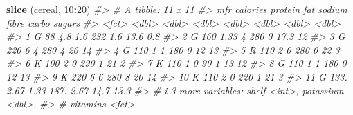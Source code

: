 \documentclass[
]{book}
\newenvironment{Shaded}{\begin{snugshade}}{\end{snugshade}}
\newcommand{\CommentTok}[1]{\textcolor[rgb]{0.56,0.35,0.01}{\textit{#1}}}
\newcommand{\DecValTok}[1]{\textcolor[rgb]{0.00,0.00,0.81}{#1}}
\newcommand{\FunctionTok}[1]{\textcolor[rgb]{0.13,0.29,0.53}{\textbf{#1}}}
\newcommand{\NormalTok}[1]{#1}
\newcommand{\SpecialCharTok}[1]{\textcolor[rgb]{0.81,0.36,0.00}{\textbf{#1}}}
\begin{document}
\begin{Shaded}
\begin{Highlighting}[]
\FunctionTok{slice}\NormalTok{ (cereal, }\DecValTok{10}\SpecialCharTok{:}\DecValTok{20}\NormalTok{)}
\CommentTok{\#\textgreater{} \# A tibble: 11 x 11}
\CommentTok{\#\textgreater{}    mfr   calories protein   fat sodium fibre carbo sugars}
\CommentTok{\#\textgreater{}    \textless{}fct\textgreater{}    \textless{}dbl\textgreater{}   \textless{}dbl\textgreater{} \textless{}dbl\textgreater{}  \textless{}dbl\textgreater{} \textless{}dbl\textgreater{} \textless{}dbl\textgreater{}  \textless{}dbl\textgreater{}}
\CommentTok{\#\textgreater{}  1 G          88     4.8   1.6    232   1.6   13.6    0.8}
\CommentTok{\#\textgreater{}  2 G         160     1.33  4      280   0     17.3   12  }
\CommentTok{\#\textgreater{}  3 G         220     6     4      280   4     26     14  }
\CommentTok{\#\textgreater{}  4 G         110     1     1      180   0     12     13  }
\CommentTok{\#\textgreater{}  5 R         110     2     0      280   0     22      3  }
\CommentTok{\#\textgreater{}  6 K         100     2     0      290   1     21      2  }
\CommentTok{\#\textgreater{}  7 K         110     1     0       90   1     13     12  }
\CommentTok{\#\textgreater{}  8 G         110     1     1      180   0     12     13  }
\CommentTok{\#\textgreater{}  9 K         220     6     6      280   8     20     14  }
\CommentTok{\#\textgreater{} 10 K         110     2     0      220   1     21      3  }
\CommentTok{\#\textgreater{} 11 G         133.    2.67  1.33   187.  2.67  14.7   13.3}
\CommentTok{\#\textgreater{} \# i 3 more variables: shelf \textless{}int\textgreater{}, potassium \textless{}dbl\textgreater{},}
\CommentTok{\#\textgreater{} \#   vitamins \textless{}fct\textgreater{}}


\end{Highlighting}
\end{Shaded}
\end{document}
